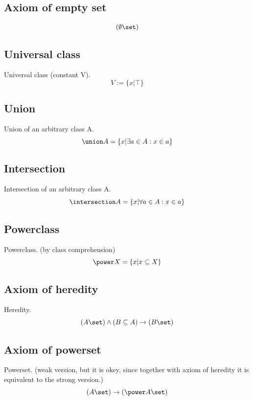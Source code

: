 \subsection{Axiom of empty set}
\begin{axiom}
\label{axm:empty class}
\[
(\emptyset\set)
\]
\end{axiom}

\subsection{Universal class}
\begin{definition} Universal class (constant V).
\label{def:universal class}
\[
V:=\{x|\top\}
\]
\end{definition}

\subsection{Union}
\begin{definition}
\label{def:union}
Union of an arbitrary class A.
\[
\union A = \{x|\exists a\in A: x\in a\}
\]
\end{definition}


\subsection{Intersection}
\begin{definition}
\label{def:intersection}
Intersection of an arbitrary class A.
\[
\intersection A = \{x|\forall a\in A: x\in a\}
\]
\end{definition}

\subsection{Powerclass}
\begin{definition}
\label{def:powerclass}
Powerclass. (by class comprehension)
\[
\power X = \{x|x\subseteq X\}
\]
\end{definition}
\subsection{Axiom of heredity}
\begin{axiom}
\label{axm:heredity}
Heredity.
\[
(A\set) \land (B\subseteq A) \rightarrow (B\set)
\]
\end{axiom}
\subsection{Axiom of powerset}
\begin{axiom}
\label{axm:powerset}
Powerset. (weak version, but it is okey, since together with axiom of heredity it is equivalent to the strong version.)
\[(A\set) \rightarrow (\power A\set)\]
\end{axiom}

